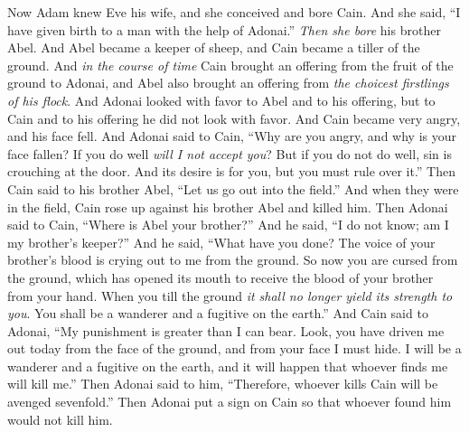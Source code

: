 \begin{biblechapter} %
 Now Adam knew Eve his wife, and she conceived and bore Cain. And she said, “I have given birth to a man with the help of Adonai.”
\verse \textit{Then she bore} his brother Abel. And Abel became a keeper of sheep, and Cain became a tiller of the ground.
\verse And \textit{in the course of time} Cain brought an offering from the fruit of the ground to Adonai,
\verse and Abel also brought an offering from \textit{the choicest firstlings of his flock}. And Adonai looked with favor to Abel and to his offering,
\verse but to Cain and to his offering he did not look with favor. And Cain became very angry, and his face fell.
\verse And Adonai said to Cain, “Why are you angry, and why is your face fallen?
\verse If you do well \textit{will I not accept you}? But if you do not do well, sin is crouching at the door. And its desire is for you, but you must rule over it.”
\verse Then Cain said to his brother Abel, “Let us go out into the field.” And when they were in the field, Cain rose up against his brother Abel and killed him.
\verse Then Adonai said to Cain, “Where is Abel your brother?” And he said, “I do not know; am I my brother’s keeper?”
\verse And he said, “What have you done? The voice of your brother’s blood is crying out to me from the ground.
\verse So now you are cursed from the ground, which has opened its mouth to receive the blood of your brother from your hand.
\verse When you till the ground \textit{it shall no longer yield its strength to you}. You shall be a wanderer and a fugitive on the earth.”
\verse And Cain said to Adonai, “My punishment is greater than I can bear.
\verse Look, you have driven me out today from the face of the ground, and from your face I must hide. I will be a wanderer and a fugitive on the earth, and it will happen that whoever finds me will kill me.”
\verse Then Adonai said to him, “Therefore, whoever kills Cain will be avenged sevenfold.” Then Adonai put a sign on Cain so that whoever found him would not kill him.

\end{biblechapter}

